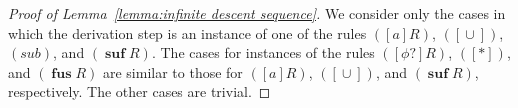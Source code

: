 \documentclass[manuscript,screen]{acmart}
\newcommand{\mult}[0]{\preceq_m}
\DeclareMathOperator{\cho}{\cup}
\newcommand{\Sub}[0]{{\textit{sub}}}
\DeclareMathOperator{\osuf}{\mathbf{suf}}
\DeclareMathOperator{\ofus}{\mathbf{fus}}
\newcommand{\len}[0]{\textbf{len}}
\begin{document}
\begin{proof}[Proof of Lemma~\ref{lemma:infinite descent sequence}]
We consider only the cases in which the derivation step is an instance of one of the rules $([a]R)$, $([\cho])$, $(\Sub)$, and $(\osuf R)$. The cases for instances of the rules $([\phi?]R)$, $([*])$, and $(\ofus R)$ are similar to those for $([a]R)$, $([\cho])$, and $(\osuf R)$, respectively. The other cases are trivial. 


\end{proof}
\end{document}
